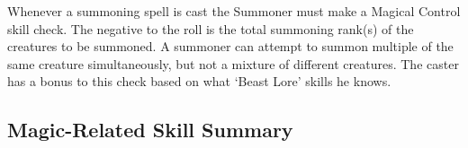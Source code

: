 \documentclass[twoside]{book}
\begin{document}
    {  
      Whenever a summoning spell is cast the Summoner
               must make a Magical Control skill check. The negative to
               the roll is the total summoning rank(s) of the creatures
               to be summoned. A summoner can attempt to summon multiple
               of the same creature simultaneously, but not a mixture of
               different creatures. The caster has a bonus to this check
               based on what `Beast Lore' skills he knows.
               
    }
  
    

\subsection{Magic-Related Skill Summary}
    
\end{document}
